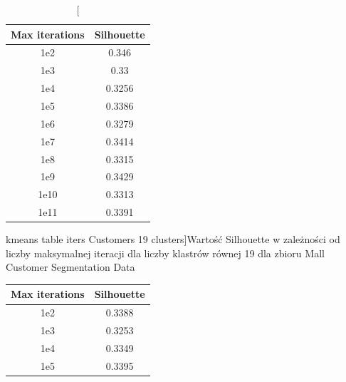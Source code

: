 \documentclass{classrep}
\begin{document}
{{\begin{table}[!htbp]
\begin{minipage}{.48\textwidth}
                \end{minipage}
                \hfill
                \begin{minipage}{.48\textwidth}
                    \centering
                    \begin{tabular}{|c|c|}
                        \hline
                        Max iterations & Silhouette \\ \hline
                        1e2 & 0.346 \\ \hline
                        1e3 & 0.33 \\ \hline
                        1e4 & 0.3256 \\ \hline
                        1e5 & 0.3386 \\ \hline
                        1e6 & 0.3279 \\ \hline
                        1e7 & 0.3414 \\ \hline
                        1e8 & 0.3315 \\ \hline
                        1e9 & 0.3429 \\ \hline
                        1e10 & 0.3313 \\ \hline
                        1e11 & 0.3391 \\ \hline
                    \end{tabular}
                    \caption
                    [kmeans table iters Customers 19 clusters]{Wartość Silhouette w
                    zależności od liczby maksymalnej iteracji dla liczby klastrów
                    równej 19 dla zbioru Mall Customer Segmentation Data}
                    \label{kmeans_table_iters_Customers_19_clusters}
                \end{minipage}
                \hfill
            \end{table}
            \FloatBarrier
            \begin{table}[!htbp]
                \begin{minipage}{.5\textwidth}
                    \centering
                    \begin{tabular}{|c|c|}
                        \hline
                        Max iterations & Silhouette \\ \hline
                        1e2 & 0.3388 \\ \hline
                        1e3 & 0.3253 \\ \hline
                        1e4 & 0.3349 \\ \hline
                        1e5 & 0.3395 \\ \hline

\end{tabular}
\end{minipage}
\end{table}}}
\end{document}
